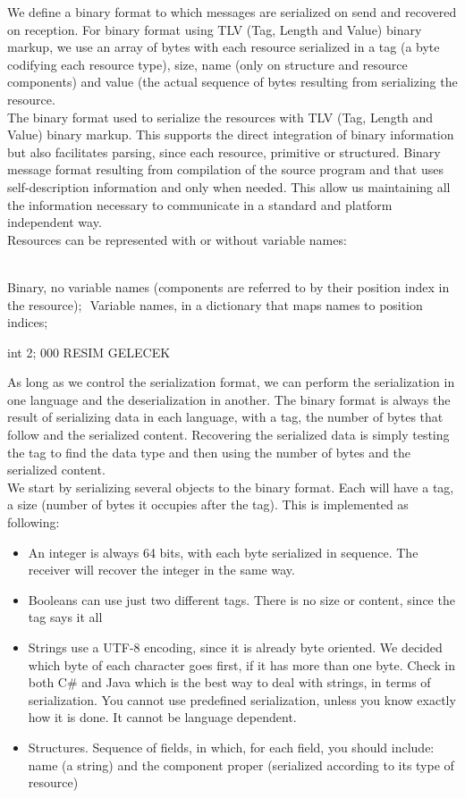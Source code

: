 We define a binary format to which messages are serialized on send and recovered on reception. For binary format using
TLV (Tag, Length and Value) binary markup\citep{asn1:opt}, we use an array of bytes with each resource serialized in a tag (a byte
codifying each resource type), size, name (only on structure and resource components) and value (the actual sequence
of bytes resulting from serializing the resource.\\

The binary format used to serialize the resources with TLV (Tag, Length and Value) binary markup. This supports the
direct integration of binary information but also facilitates parsing, since each resource, primitive or structured.
Binary message format resulting from compilation of the source program and that uses self-description information and
only when needed. This allow us maintaining all the information necessary to communicate in a standard and platform
independent way.\\

Resources can be represented with or without variable names:\\ 

Binary, no variable names (components are referred to by their position index in the resource); 
Variable names, in a dictionary that maps names to position indices; 

int 2;   000 RESIM GELECEK

As long as we control the serialization format, we can perform the serialization in one language and the
deserialization in another. The binary format is always the result of serializing data in each language, with a tag,
the number of bytes that follow and the serialized content. Recovering the serialized data is simply testing the tag
to find the data type and then using the number of bytes and the serialized content.\\

We start by serializing several objects to the binary format. Each will have a tag, a size (number of bytes it occupies after
the tag). This is implemented as following:

\begin{itemize}

\item 	An integer is always 64 bits, with each byte serialized in sequence. The receiver will recover the integer in the
same way.
\item 	Booleans can use just two different tags. There is no size or content, since the tag says it all
\item 	Strings use a UTF-8 encoding, since it is already byte oriented. We decided which byte of each character goes first, if it has more than one byte. Check in both C# and Java which is the best way to deal with strings, in terms of serialization. You cannot use predefined serialization, unless you know exactly how it is done. It cannot be language dependent.
\item 	Structures. Sequence of fields, in which, for each field, you should include: name (a string) and the component proper (serialized according to its type of resource)
\end{itemize}

